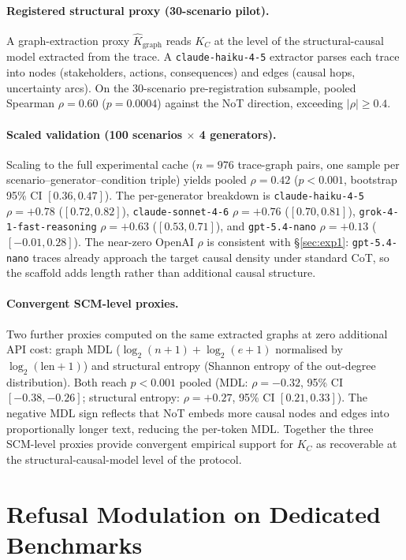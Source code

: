 \documentclass[11pt]{article}
\begin{document}
\paragraph{Registered structural proxy (30-scenario pilot).}
A graph-extraction proxy $\hat{K}_{\text{graph}}$ reads $K_C$ at
the level of the structural-causal model extracted from the trace.
A \texttt{claude-haiku-4-5} extractor parses each trace into nodes
(stakeholders, actions, consequences) and edges (causal hops,
uncertainty arcs). On the 30-scenario pre-registration subsample,
pooled Spearman $\rho = 0.60$ ($p = 0.0004$) against the NoT
direction, exceeding $|\rho| \geq 0.4$.

\paragraph{Scaled validation (100 scenarios $\times$ 4 generators).}
Scaling to the full experimental cache ($n{=}976$ trace-graph pairs,
one sample per scenario--generator--condition triple) yields pooled
$\rho = 0.42$ ($p < 0.001$, bootstrap 95\% CI $[0.36, 0.47]$). The
per-generator breakdown is \texttt{claude-haiku-4-5} $\rho{=}{+0.78}$
($[0.72, 0.82]$), \texttt{claude-sonnet-4-6} $\rho{=}{+0.76}$
($[0.70, 0.81]$), \texttt{grok-4-1-fast-reasoning} $\rho{=}{+0.63}$
($[0.53, 0.71]$), and \texttt{gpt-5.4-nano} $\rho{=}{+0.13}$
($[-0.01, 0.28]$). The near-zero OpenAI $\rho$ is consistent with
\S\ref{sec:exp1}: \texttt{gpt-5.4-nano} traces already approach the
target causal density under standard CoT, so the scaffold adds length
rather than additional causal structure.

\paragraph{Convergent SCM-level proxies.}
Two further proxies computed on the same extracted graphs at zero
additional API cost: graph MDL ($\log_2(n{+}1){+}\log_2(e{+}1)$
normalised by $\log_2(\text{len}{+}1)$) and structural entropy
(Shannon entropy of the out-degree distribution). Both reach
$p < 0.001$ pooled (MDL: $\rho = -0.32$, 95\% CI $[-0.38, -0.26]$;
structural entropy: $\rho = +0.27$, 95\% CI $[0.21, 0.33]$). The
negative MDL sign reflects that NoT embeds more causal nodes and
edges into proportionally longer text, reducing the per-token MDL.
Together the three SCM-level proxies provide convergent empirical
support for $K_C$ as recoverable at the structural-causal-model
level of the protocol.

\section{Refusal Modulation on Dedicated Benchmarks}
\label{app:refusal}
\end{document}

